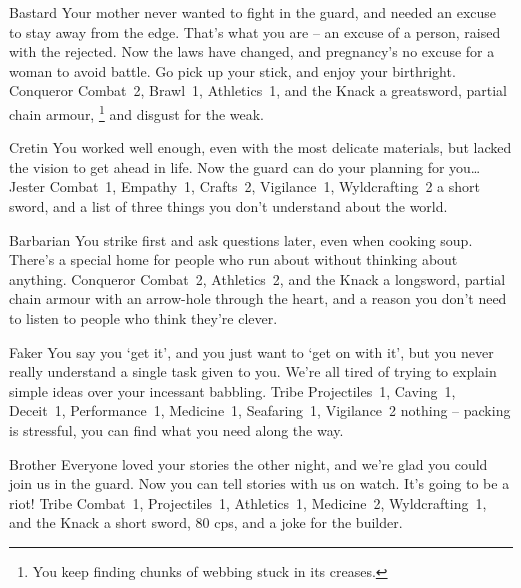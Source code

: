 \begin{multicols}{2}
\begin{itemize}

  {Bastard}%
  {Your mother never wanted to fight in the \gls{guard}, and needed an excuse to stay away from the \gls{edge}.
  That's what you are -- an excuse of a person, raised with the rejected.
  Now the laws have changed, and pregnancy's no excuse for a woman to avoid battle.
  Go pick up your stick, and enjoy your birthright.}%
  {Conqueror}%
  {Combat~2, Brawl~1, Athletics~1, and the Knack \adrenalinesurge}%
  {a greatsword, partial chain armour,%
  \footnote{You keep finding chunks of webbing stuck in its creases.}
  and disgust for the weak.}%

  {Cretin}%
  {You worked well enough, even with the most delicate materials, but lacked the vision to get ahead in life.
  Now the \gls{guard} can do your planning for you\ldots
  }%
  {Jester}%
  {Combat~1, Empathy~1, Crafts~2, Vigilance~1, Wyldcrafting~2}%
  {a short sword, and a list of three things you don't understand about the world.}%


  {Barbarian}%
  {You strike first and ask questions later, even when cooking soup.
  There's a special home for people who run about without thinking about anything.
  }%
  {Conqueror}%
  {Combat~2, Athletics~2, and the Knack \laststand}%
  {a longsword, partial chain armour with an arrow-hole through the heart, and a reason you don't need to listen to people who think they're clever.}%


  {Faker}%
  {You say you `get it', and you just want to `get on with it', but you never really understand a single task given to you.
  We're all tired of trying to explain simple ideas over your incessant babbling.
  }%
  {Tribe}%
  {Projectiles~1, Caving~1, Deceit~1, Performance~1, Medicine~1, Seafaring~1, Vigilance~2}%
  {nothing -- packing is stressful, you can find what you need along the way.}%

  {Brother}%
  {Everyone loved your stories the other night, and we're glad you could join us in the \gls{guard}.
  Now you can tell stories with us on watch.
  It's going to be a riot!
  }%
  {Tribe}%
  {Combat~1, Projectiles~1, Athletics~1, Medicine~2, Wyldcrafting~1, and the Knack \guardian}%
  {a short sword, 80 \glspl{cp}, and a joke for the builder.}%


\end{itemize}
\end{multicols}
